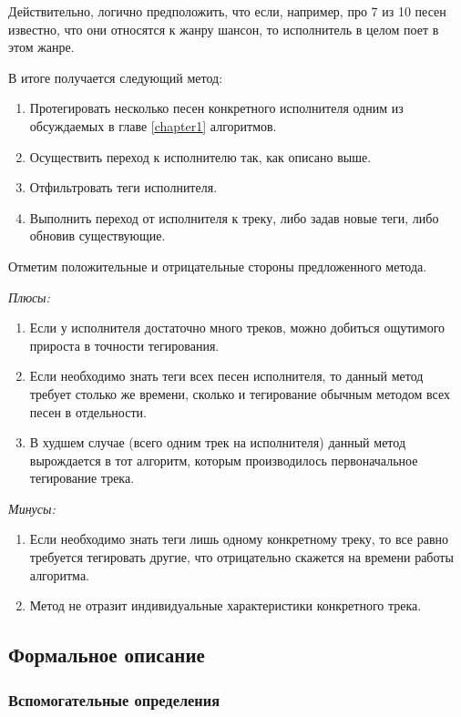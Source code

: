 Действительно, логично предположить, что если, например, про 7 из 10 песен известно, что они относятся к жанру шансон, то исполнитель в целом 
поет в этом жанре.

В итоге получается следующий метод:
\begin{enumerate}
 \item Протегировать несколько песен конкретного исполнителя одним из обсуждаемых в главе \ref{chapter1} алгоритмов.
 \item Осуществить переход к исполнителю так, как описано выше.
 \item Отфильтровать теги исполнителя.
 \item Выполнить переход от исполнителя к треку, либо задав новые теги, либо обновив существующие.
\end{enumerate}

Отметим положительные и отрицательные стороны предложенного метода.

\emph{Плюсы:} 
\begin{enumerate}
 \item Если у исполнителя достаточно много треков, можно добиться ощутимого прироста в точности тегирования.
 \item Если необходимо знать теги всех песен исполнителя, то данный метод требует столько же времени, сколько и тегирование обычным методом всех песен в отдельности.
 \item В худшем случае (всего одним трек на исполнителя) данный метод вырождается в тот алгоритм, которым производилось первоначальное тегирование трека.
\end{enumerate}

\emph{Минусы:} 
\begin{enumerate}
 \item Если необходимо знать теги лишь одному конкретному треку, то все равно требуется тегировать другие, что отрицательно скажется на времени работы алгоритма.
 \item Метод не отразит индивидуальные характеристики конкретного трека.
\end{enumerate}

\subsection{Формальное описание}

\subsubsection{Вспомогательные определения}

